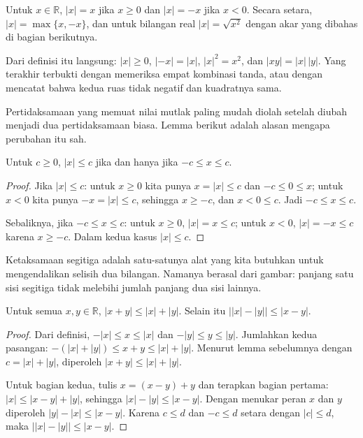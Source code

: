 \begin{definisi}
Untuk $x\in\mathbb{R}$, $|x|=x$ jika $x\ge 0$ dan $|x|=-x$ jika $x<0$. Secara setara,
$|x|=\max\{x,-x\}$, dan untuk bilangan real $|x|=\sqrt{x^2}$ dengan akar yang
dibahas di bagian berikutnya.
\end{definisi}

Dari definisi itu langsung: $|x|\ge 0$, $|{-x}|=|x|$, $|x|^2=x^2$, dan $|xy|=|x|\,|y|$.
Yang terakhir terbukti dengan memeriksa empat kombinasi tanda, atau dengan mencatat
bahwa kedua ruas tidak negatif dan kuadratnya sama.

Pertidaksamaan yang memuat nilai mutlak paling mudah diolah setelah diubah menjadi dua
pertidaksamaan biasa. Lemma berikut adalah alasan mengapa perubahan itu sah.

\begin{lemma}
Untuk $c\ge 0$, $|x|\le c$ jika dan hanya jika $-c\le x\le c$.
\end{lemma}

\begin{proof}
Jika $|x|\le c$: untuk $x\ge 0$ kita punya $x=|x|\le c$ dan $-c\le 0\le x$; untuk
$x<0$ kita punya $-x=|x|\le c$, sehingga $x\ge -c$, dan $x<0\le c$. Jadi
$-c\le x\le c$.

Sebaliknya, jika $-c\le x\le c$: untuk $x\ge 0$, $|x|=x\le c$; untuk $x<0$,
$|x|=-x\le c$ karena $x\ge -c$. Dalam kedua kasus $|x|\le c$.
\end{proof}

Ketaksamaan segitiga adalah satu-satunya alat yang kita butuhkan untuk mengendalikan
selisih dua bilangan. Namanya berasal dari gambar: panjang satu sisi segitiga tidak
melebihi jumlah panjang dua sisi lainnya.

\begin{teorema}
Untuk semua $x,y\in\mathbb{R}$, $|x+y|\le |x|+|y|$. Selain itu
$\bigl||x|-|y|\bigr|\le |x-y|$.
\end{teorema}

\begin{proof}
Dari definisi, $-|x|\le x\le |x|$ dan $-|y|\le y\le |y|$. Jumlahkan kedua pasangan:
$-(|x|+|y|)\le x+y\le |x|+|y|$. Menurut lemma sebelumnya dengan $c=|x|+|y|$, diperoleh
$|x+y|\le |x|+|y|$.

Untuk bagian kedua, tulis $x=(x-y)+y$ dan terapkan bagian pertama:
$|x|\le |x-y|+|y|$, sehingga $|x|-|y|\le |x-y|$. Dengan menukar peran $x$ dan $y$
diperoleh $|y|-|x|\le |x-y|$. Karena $c\le d$ dan $-c\le d$ setara dengan $|c|\le d$,
maka $\bigl||x|-|y|\bigr|\le |x-y|$.
\end{proof}

